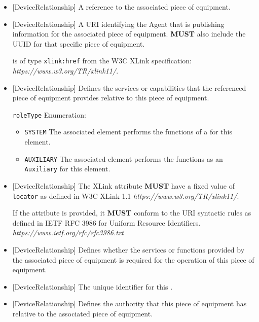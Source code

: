 \begin{itemize}

\item {}[DeviceRelationship] \newline A reference to the associated piece of equipment. 


\item {}[DeviceRelationship] \newline A URI identifying the \gls{Agent} that is publishing information for the associated piece of equipment.  \textbf{MUST} also include the UUID for that specific piece of equipment.

 is of type \texttt{xlink:href} from the W3C XLink specification: \textit{https://www.w3.org/TR/xlink11/}.

\item {}[DeviceRelationship] \newline Defines the services or capabilities that the referenced piece of equipment provides relative to this piece of equipment.

\texttt{roleType} Enumeration:

\begin{itemize}
\item \texttt{SYSTEM} \newline The associated element performs the functions of a  for this element. 
\item \texttt{AUXILIARY} \newline The associated element performs the functions as an \texttt{Auxiliary} for this element. 
\end{itemize}


\item {}[DeviceRelationship] \newline The XLink  attribute \textbf{MUST} have a fixed value of \texttt{locator} as defined in W3C XLink 1.1 \textit{https://www.w3.org/TR/xlink11/}.

If the  attribute is provided, it \textbf{MUST} conform to the URI syntactic rules as defined in IETF RFC 3986 for Uniform Resource Identifiers. \textit{https://www.ietf.org/rfc/rfc3986.txt}

\item {}[DeviceRelationship] \newline Defines whether the services or functions provided by the associated piece of equipment is required for the operation of this piece of equipment.

\item {}[DeviceRelationship] \newline The unique identifier for this .

\item {}[DeviceRelationship] \newline Defines the authority that this piece of equipment has relative to the associated piece of equipment.
\end{itemize}


